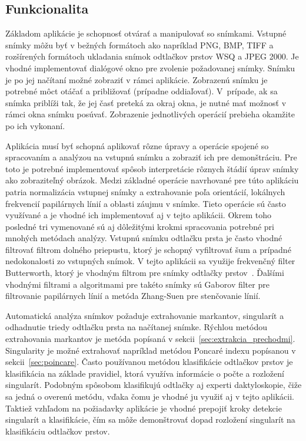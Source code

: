   \subsection{Funkcionalita}
  Základom aplikácie je schopnosť otvárať a manipulovať so snímkami. Vstupné snímky môžu byť v bežných formátoch ako napríklad PNG, BMP, TIFF a rozšírených
  formátoch ukladania snímok odtlačkov prstov WSQ a JPEG 2000. Je vhodné implementovať dialógové okno pre zvolenie požadovanej snímky.
  Snímku je po jej načítaní možné zobraziť v rámci aplikácie. Zobrazenú snímku je potrebné môct otáčať a približovať (prípadne oddiaľovať). V~prípade, ak
  sa snímka priblíži tak, že jej časť preteká za okraj okna, je nutné mať možnosť v rámci okna snímku posúvať. Zobrazenie jednotlivých operácií prebieha
  okamžite po ich vykonaní.

  Aplikácia musí byť schopná aplikovať rôzne úpravy a operácie spojené so spracovaním a analýzou na vstupnú snímku a zobraziť ich pre demonštráciu.
  Pre toto je potrebné implementovať spôsob interpretácie rôznych štádií úprav snímky ako zobraziteľný obrázok. Medzi základné operácie navrhované pre túto
  aplikáciu patria normalizácia vstupnej snímky a extrahovanie poľa orientácií, lokálnych frekvencií papilárnych línií a oblasti záujmu v snímke. Tieto
  operácie sú často využívané a je vhodné ich implementovať aj v tejto aplikácii. Okrem toho posledné tri vymenované sú aj dôležitými krokmi spracovania
  potrebné pri mnohých metódach analýzy. Vstupnú snímku odtlačku prsta je často vhodné filtrovať filtrom dolného priepustu, ktorý je schopný vyfiltrovať šum
  a prípadné nedokonalosti zo vstupných snímok. V tejto aplikácii sa využije frekvenčný filter Butterworth, ktorý je vhodným filtrom pre snímky odtlačky
  prstov~{\cite{Drahansky}}. Ďalšími vhodnými filtrami a algoritmami pre takéto snímky sú Gaborov filter pre filtrovanie papilárnych línií a
  metóda Zhang-Suen pre stenčovanie línií.

  Automatická analýza snímkov požaduje extrahovanie markantov, singularít a odhadnutie triedy odtlačku prsta na načítanej snímke. Rýchlou metódou extrahovania
  markantov je metóda popísaná v sekcii~{\ref{sec:extrakcia_prechodmi}}. Singularity je možné extrahovať napríklad metódou Poncaré indexu popísanou v
  sekcii~{\ref{sec:poincare}}. Často používanou metódou klasifikácie odtlačkov prstov je klasifikácia na základe pravidiel, ktorá využíva informácie o
  počte a rozložení singularít.
  Podobným spôsobom klasifikujú odtlačky aj experti daktyloskopie, čiže sa jedná o overenú metódu, vďaka čomu je vhodné ju využiť aj v tejto aplikácii.
  Taktiež vzhľadom na požiadavky aplikácie je vhodné prepojiť kroky detekcie singularít a klasifikácie, čím sa môže demonštrovať
  dopad rozložení singularít na klasifikáciu odtlačkov prstov.


